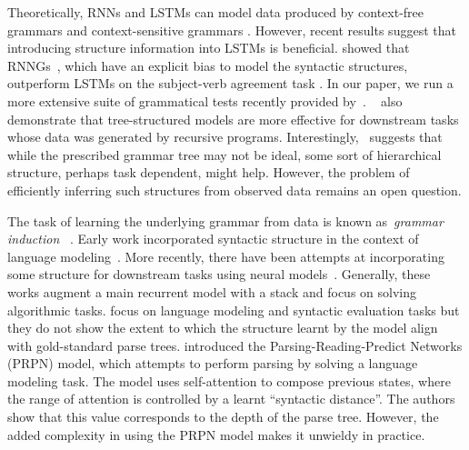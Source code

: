 \documentclass{article} \usepackage{iclr2019_conference,times}
\begin{document}
Theoretically, RNNs and LSTMs can model data produced by context-free grammars and context-sensitive grammars \citep{gers2001lstm}.
However, recent results suggest that introducing structure information into LSTMs is beneficial. \cite{kuncoro2018lstms} showed that RNNGs~\citep{dyer2016recurrent}, which have an explicit bias to model the syntactic structures, outperform LSTMs on the subject-verb agreement task \citep{linzen2016assessing}.
In our paper, we run a more extensive suite of grammatical tests recently provided by~\cite{marvin2018targeted}.
~\cite{bowman2014recursive,bowman2015tree} also demonstrate that tree-structured models are more effective for downstream tasks whose data was generated by recursive programs.
Interestingly,~\cite{shi2018tree} suggests that while the prescribed grammar tree may not be ideal, some sort of hierarchical structure, perhaps task dependent, might help.
However, the problem of efficiently inferring such structures from observed data remains an open question.





The task of learning the underlying grammar from data is known as~\emph{grammar induction} ~\citep{chen1995bayesian, cohen2011unsupervised}. Early work incorporated syntactic structure in the context of language modeling~\citep{roark2001probabilistic, charniak2001immediate, chelba2000structured}.
More recently, there have been attempts at incorporating some structure for downstream tasks using neural models~\citep{grefenstette2015learning, sun2017neural,joulin2015inferring}.
Generally, these works augment a main recurrent model with a stack and focus on solving algorithmic tasks.
\cite{yogatama2018memory} focus on language modeling and syntactic evaluation tasks \citep{linzen2016assessing} but they do not show the extent to which the structure learnt by the model align with gold-standard parse trees. \cite{shen2017neural} introduced the Parsing-Reading-Predict Networks (PRPN) model, which attempts to perform parsing by solving a language modeling task. The model uses self-attention to compose previous states, where the range of attention is controlled by a learnt ``syntactic distance''. The authors show that this value corresponds to the depth of the parse tree. However, the added complexity in using the PRPN model makes it unwieldy in practice.
\end{document}
